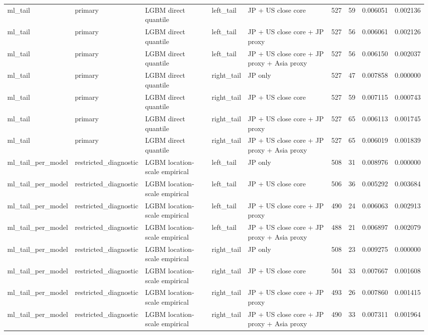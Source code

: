 \begin{tabular}{lllllrrrr}
ml\_tail & primary & LGBM direct quantile & left\_tail & JP + US close core & 527 & 59 & 0.006051 & 0.002136 \\
ml\_tail & primary & LGBM direct quantile & left\_tail & JP + US close core + JP proxy & 527 & 56 & 0.006061 & 0.002126 \\
ml\_tail & primary & LGBM direct quantile & left\_tail & JP + US close core + JP proxy + Asia proxy & 527 & 56 & 0.006150 & 0.002037 \\
ml\_tail & primary & LGBM direct quantile & right\_tail & JP only & 527 & 47 & 0.007858 & 0.000000 \\
ml\_tail & primary & LGBM direct quantile & right\_tail & JP + US close core & 527 & 59 & 0.007115 & 0.000743 \\
ml\_tail & primary & LGBM direct quantile & right\_tail & JP + US close core + JP proxy & 527 & 65 & 0.006113 & 0.001745 \\
ml\_tail & primary & LGBM direct quantile & right\_tail & JP + US close core + JP proxy + Asia proxy & 527 & 65 & 0.006019 & 0.001839 \\
ml\_tail\_per\_model & restricted\_diagnostic & LGBM location-scale empirical & left\_tail & JP only & 508 & 31 & 0.008976 & 0.000000 \\
ml\_tail\_per\_model & restricted\_diagnostic & LGBM location-scale empirical & left\_tail & JP + US close core & 506 & 36 & 0.005292 & 0.003684 \\
ml\_tail\_per\_model & restricted\_diagnostic & LGBM location-scale empirical & left\_tail & JP + US close core + JP proxy & 490 & 24 & 0.006063 & 0.002913 \\
ml\_tail\_per\_model & restricted\_diagnostic & LGBM location-scale empirical & left\_tail & JP + US close core + JP proxy + Asia proxy & 488 & 21 & 0.006897 & 0.002079 \\
ml\_tail\_per\_model & restricted\_diagnostic & LGBM location-scale empirical & right\_tail & JP only & 508 & 23 & 0.009275 & 0.000000 \\
ml\_tail\_per\_model & restricted\_diagnostic & LGBM location-scale empirical & right\_tail & JP + US close core & 504 & 33 & 0.007667 & 0.001608 \\
ml\_tail\_per\_model & restricted\_diagnostic & LGBM location-scale empirical & right\_tail & JP + US close core + JP proxy & 493 & 26 & 0.007860 & 0.001415 \\
ml\_tail\_per\_model & restricted\_diagnostic & LGBM location-scale empirical & right\_tail & JP + US close core + JP proxy + Asia proxy & 490 & 33 & 0.007311 & 0.001964 \\

\end{tabular}
